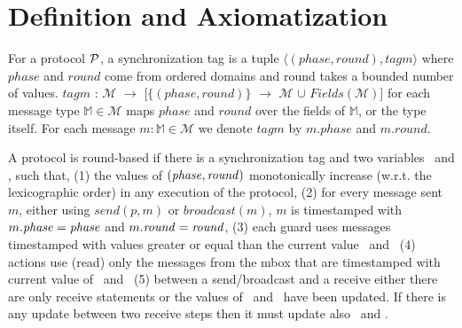 \section{Definition and Axiomatization}
\label{commclosure:definition}

\begin{definition}
\label{def:synctag}
For a protocol $\mathcal{P}$, a synchronization tag is a tuple 
$\langle(\mathit{phase},\mathit{round}),\mathit{tagm} \rangle$ where $\mathit{phase}$ and $\mathit{round}$ come from ordered domains and round takes a bounded number of values. $\mathit{tagm}$ : $\mathcal{M}$ $\rightarrow$ $[\{(\mathit{phase},\mathit{round})\}$ $\rightarrow$ $\mathcal{M}$ $\cup$ $\mathit{Fields}(\mathcal{M})]$ for each message type $\mathbb{M} \in \mathcal{M}$ maps $\mathit{phase}$ and $\mathit{round}$ over the fields of $\mathbb{M}$, or the type itself.
For each message $m:\mathbb{M} \in \mathcal{M}$ we denote $\mathit{tagm}$ by $\mathit{m.phase}$ and $\mathit{m.round}$.
\end{definition}

A protocol is round-based if there is a synchronization tag and two variables \phase\ and \round, such that, 
(1) the values of $(\mathit{phase},\mathit{round})$ monotonically increase (w.r.t. the lexicographic order) in any execution of the protocol,
(2) for every message sent $m$, either using $\mathit{send(p,m)}$ or $\mathit{broadcast(m)}$, $m$ is timestamped with $m.\mathit{phase}=\mathit{phase}$ and $m.\mathit{round}=\mathit{round}$, 
(3) each guard uses messages timestamped with values greater or equal than the current value \phase\ and \round\, 
(4) actions use (read) only the messages from the mbox that are timestamped with current value of \phase\ and \round\, 
(5) between a send/broadcast and a receive either there are only receive statements or the values of \phase\ and \round\ have been updated. If there is any update between two receive steps then it must update also  \phase\ and \round.  